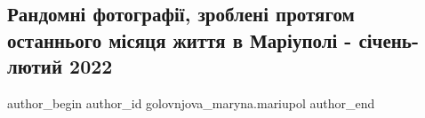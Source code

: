  
 
 
 
 

\subsection{Рандомні фотографії, зроблені протягом останнього місяця життя в Маріуполі - січень-лютий 2022}
\label{sec:23_02_2023.fb.golovnjova_maryna.mariupol.1.randomn__fotograf__}

\ifcmt
 author_begin
   author_id golovnjova_maryna.mariupol
 author_end
\fi
